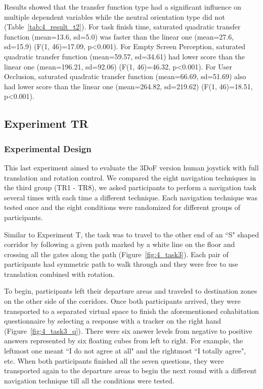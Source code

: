 Results showed that the transfer function type had a significant influence on multiple dependent variables while the neutral orientation type did not (Table~\ref{tab:4_result_t2}). For task finish time, saturated quadratic transfer function (mean=13.6, sd=5.0) was faster than the linear one (mean=27.6, sd=15.9) (F(1, 46)=17.09, p\textless 0.001). For Empty Screen Perception, saturated quadratic transfer function (mean=59.57, sd=34.61) had lower score than the linear one (mean=196.21, sd=92.06) (F(1, 46)=46.32, p\textless 0.001). For User Occlusion, saturated quadratic transfer function (mean=66.69, sd=51.69) also had lower score than the linear one (mean=264.82, sd=219.62) (F(1, 46)=18.51, p\textless 0.001).


\subsection{Experiment TR}

\subsubsection{Experimental Design}
This last experiment aimed to evaluate the 3DoF version human joystick with full translation and rotation control. We compared the eight navigation techniques in the third group (TR1 - TR8), we asked participants to perform a navigation task several times with each time a different technique. Each navigation technique was tested once and the eight conditions were randomized for different groups of participants.

Similar to Experiment T, the task was to travel to the other end of an ``S" shaped corridor by following a given path marked by a white line on the floor and crossing all the gates along the path (Figure~\ref{fig:4_task3}). Each pair of participants had symmetric path to walk through and they were free to use translation combined with rotation.

To begin, participants left their departure areas and traveled to destination zones on the other side of the corridors. Once both participants arrived, they were transported to a separated virtual space to finish the aforementioned cohabitation questionnaire by selecting a response with a tracker on the right hand (Figure~\ref{fig:4_task3_q}). There were six answer levels from negative to positive answers represented by six floating cubes from left to right. For example, the leftmost one meant ``I do not agree at all" and the rightmost ``I totally agree", etc.  When both participants finished all the seven questions, they were transported again to the departure areas to begin the next round with a different navigation technique till all the conditions were tested.

